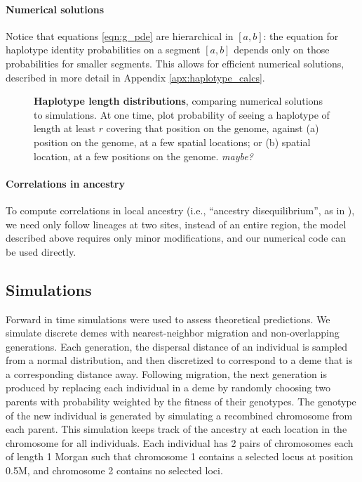 \documentclass[12pt]{article}
\newcommand{\plr}[1]{{\em \color{blue} #1}}
\begin{document}
\paragraph{Numerical solutions}
Notice that equations \eqref{eqn:g_pde}
are hierarchical in $[a,b]$:
the equation for haplotype identity probabilities on a segment $[a,b]$ depends only on those probabilities for smaller segments.
This allows for efficient numerical solutions,
described in more detail in Appendix \ref{apx:haplotype_calcs}.

\begin{figure}
    \begin{center}
    \end{center}
    \caption{
        \textbf{Haplotype length distributions},
        comparing numerical solutions to simulations.
        At one time, plot 
        probability of seeing a haplotype of length at least $r$ covering that position on the genome,
        against (a) position on the genome, at a few spatial locations;
        or (b) spatial location, at a few positions on the genome.
        \plr{maybe?}
        \label{fig:haplotype_lengths}
    }
\end{figure}

\paragraph{Correlations in ancestry}
To compute correlations in local ancestry
(i.e., ``ancestry disequilibrium'', as in \citet{pool,brandvainthisvolume}),
we need only follow lineages at two sites, instead of an entire region,
the model described above requires only minor modifications,
and our numerical code can be used directly.


\subsection{Simulations}
Forward in time simulations were used to assess theoretical predictions. We simulate discrete demes with nearest-neighbor migration and non-overlapping generations. Each generation, the dispersal distance of an individual is sampled from a normal distribution, and then discretized to correspond to a deme that is a corresponding distance away. Following migration, the next generation is produced by replacing each individual in a deme by randomly choosing two parents with probability weighted by the fitness of their genotypes. The genotype of the new individual is generated by simulating a recombined chromosome from each parent. This simulation keeps track of the ancestry at each location in the chromosome for all individuals. Each individual has 2 pairs of chromosomes each of length 1 Morgan such that chromosome 1 contains a selected locus at position 0.5M, and chromosome 2 contains no selected loci.
\end{document}
